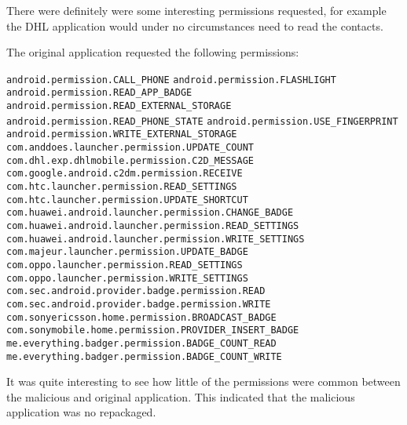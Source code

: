 There were definitely were some interesting permissions requested, for example the DHL application would under no circumstances need to read the contacts.

\newpage
{}
The original application requested the following permissions:

\texttt{android.permission.CALL\_PHONE}
\newline \texttt{android.permission.FLASHLIGHT}
\newline \texttt{android.permission.READ\_APP\_BADGE}
\newline \texttt{android.permission.READ\_EXTERNAL\_STORAGE}
\newline \texttt{android.permission.READ\_PHONE\_STATE}
\newline \texttt{android.permission.USE\_FINGERPRINT}
\newline \texttt{android.permission.WRITE\_EXTERNAL\_STORAGE}
\newline \texttt{com.anddoes.launcher.permission.UPDATE\_COUNT}
\newline \texttt{com.dhl.exp.dhlmobile.permission.C2D\_MESSAGE}
\newline \texttt{com.google.android.c2dm.permission.RECEIVE}
\newline \texttt{com.htc.launcher.permission.READ\_SETTINGS}
\newline \texttt{com.htc.launcher.permission.UPDATE\_SHORTCUT}
\newline \texttt{com.huawei.android.launcher.permission.CHANGE\_BADGE}
\newline \texttt{com.huawei.android.launcher.permission.READ\_SETTINGS}
\newline \texttt{com.huawei.android.launcher.permission.WRITE\_SETTINGS}
\newline \texttt{com.majeur.launcher.permission.UPDATE\_BADGE}
\newline \texttt{com.oppo.launcher.permission.READ\_SETTINGS}
\newline \texttt{com.oppo.launcher.permission.WRITE\_SETTINGS}
\newline \texttt{com.sec.android.provider.badge.permission.READ}
\newline \texttt{com.sec.android.provider.badge.permission.WRITE}
\newline \texttt{com.sonyericsson.home.permission.BROADCAST\_BADGE}
\newline \texttt{com.sonymobile.home.permission.PROVIDER\_INSERT\_BADGE}
\newline \texttt{me.everything.badger.permission.BADGE\_COUNT\_READ}
\newline \texttt{me.everything.badger.permission.BADGE\_COUNT\_WRITE}

It was quite interesting to see how little of the permissions were common between the malicious and original application.
This indicated that the malicious application was no repackaged.